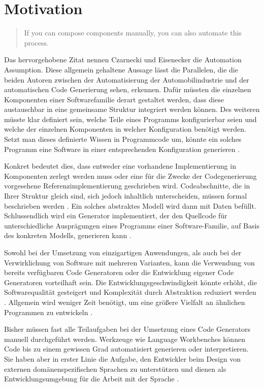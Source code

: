 \documentclass[12pt,oneside,a4paper,parskip]{scrbook}
\begin{document}
\section{Motivation}

\begin{quote}
	\glqq If you can compose components manually, you can also automate this process.\grqq
\end{quote}

Das hervorgehobene Zitat nennen Czarnecki und Eisenecker die Automation Assumption. Diese allgemein gehaltene Aussage lässt die Parallelen, die die beiden Autoren zwischen der Automatisierung der Automobilindustrie und der automatischen Code Generierung sehen, erkennen. Dafür müssten die einzelnen Komponenten einer Softwarefamilie derart gestaltet werden, dass diese austauschbar in eine gemeinsame Struktur integriert werden können. Des weiteren müsste klar definiert sein, welche Teile eines Programms konfigurierbar seien und welche der einzelnen Komponenten in welcher Konfiguration benötigt werden. Setzt man dieses definierte Wissen in Programmcode um, könnte ein solches Programm eine Software in einer entsprechenden Konfiguration generieren \cite{czaeis2000genprog}.

Konkret bedeutet dies, dass entweder eine vorhandene Implementierung in Komponenten zerlegt werden muss oder eine für die Zwecke der Codegenerierung vorgesehene Referenzimplementierung geschrieben wird. Codeabschnitte, die in Ihrer Struktur gleich sind, sich jedoch inhaltlich unterscheiden, müssen formal beschrieben werden \cite{stahl2007mdsd}. Ein solches abstraktes Modell wird dann mit Daten befüllt. Schlussendlich wird ein Generator implementiert, der den Quellcode für unterschiedliche Ausprägungen eines Programms einer Software-Familie, auf Basis des konkreten Modells, generieren kann \cite{fowler2010dsls}.

Sowohl bei der Umsetzung von einzigartigen Anwendungen, als auch bei der Verwirklichung von Software mit mehreren Varianten, kann die Verwendung von bereits verfügbaren Code Generatoren oder die Entwicklung eigener Code Generatoren vorteilhaft sein. Die Entwicklungsgeschwindigkeit könnte erhöht, die Softwarequalität gesteigert und Komplexität durch Abstraktion reduziert werden \cite{stahl2007mdsd}. Allgemein wird weniger Zeit benötigt, um eine größere Vielfalt an ähnlichen Programmen zu entwickeln \cite{czaeis2000genprog}.

Bisher müssen fast alle Teilaufgaben bei der Umsetzung eines Code Generators manuell durchgeführt werden. Werkzeuge wie Language Workbenches können Code bis zu einem gewissen Grad automatisiert generieren oder interpretieren. Sie haben aber in erster Linie die Aufgabe, den Entwickler beim Design von externen domänenspezifischen Sprachen zu unterstützen und dienen als Entwicklungsumgebung für die Arbeit mit der Sprache \cite{fowler2010dsls}.
\end{document}
